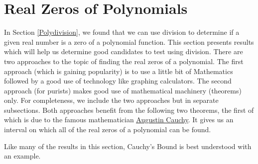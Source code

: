 \section{Real Zeros of Polynomials}
\label{RealZeros}

In Section \ref{Polydivision}, we found that we can use  division to determine if a given real number is a zero of a polynomial function.  This section presents results which will help us determine good candidates to test using  division.  There are two approaches to the topic of finding the real zeros of a polynomial.  The first approach (which is gaining popularity) is to use a little bit of Mathematics followed by a good use of technology like graphing calculators.  The second approach (for purists) makes good use of mathematical machinery (theorems) only.  For completeness, we include the two approaches but in separate subsections.  Both approaches benefit from the following two theorems, the first of which is due to the famous mathematician \href{http://en.wikipedia.org/wiki/Cauchy}{\underline{Augustin Cauchy}}.  It gives us an interval on which all of the real zeros of a polynomial can be found.


\smallskip


\smallskip


Like many of the results in this section, Cauchy's Bound is best understood with an example.

